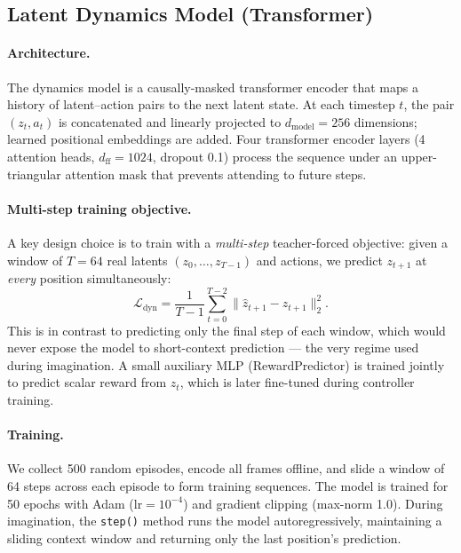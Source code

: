 \documentclass{article}
\begin{document}
\subsection{Latent Dynamics Model (Transformer)}

\paragraph{Architecture.}
The dynamics model is a causally-masked transformer encoder that maps a history of
latent--action pairs to the next latent state.
At each timestep $t$, the pair $(z_t, a_t)$ is concatenated and linearly projected to
$d_\text{model}=256$ dimensions; learned positional embeddings are added.
Four transformer encoder layers (4 attention heads, $d_\text{ff}=1024$, dropout 0.1)
process the sequence under an upper-triangular attention mask that prevents attending to
future steps.

\paragraph{Multi-step training objective.}
A key design choice is to train with a \emph{multi-step} teacher-forced objective:
given a window of $T=64$ real latents $(z_0,\ldots,z_{T-1})$ and actions, we predict
$z_{t+1}$ at \emph{every} position simultaneously:
\begin{equation}
  \mathcal{L}_\text{dyn} = \frac{1}{T-1}\sum_{t=0}^{T-2}
    \bigl\|\hat{z}_{t+1} - z_{t+1}\bigr\|_2^2.
\end{equation}
This is in contrast to predicting only the final step of each window, which would
never expose the model to short-context prediction — the very regime used during
imagination.
A small auxiliary MLP (RewardPredictor) is trained jointly to predict scalar reward
from $z_t$, which is later fine-tuned during controller training.

\paragraph{Training.}
We collect 500 random episodes, encode all frames offline, and slide a window of 64
steps across each episode to form training sequences.
The model is trained for 50 epochs with Adam ($\text{lr}=10^{-4}$) and gradient
clipping (max-norm 1.0).
During imagination, the \texttt{step()} method runs the model autoregressively,
maintaining a sliding context window and returning only the last position's prediction.
\end{document}
